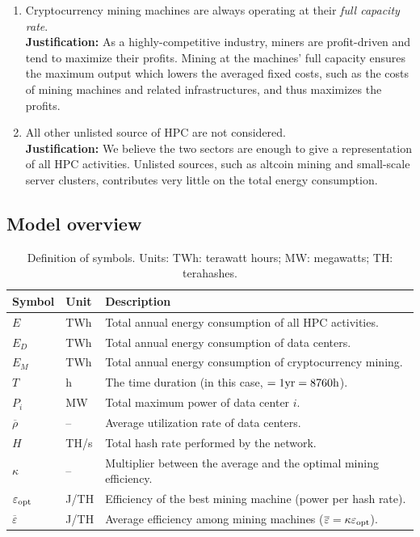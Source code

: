 \documentclass[12pt]{article}
\begin{document}
\begin{enumerate}
	\item Cryptocurrency mining machines are always operating at their \textit{full capacity rate}. \\
	\textbf{Justification:} As a highly-competitive industry, miners are profit-driven and tend to maximize their profits. Mining at the machines' full capacity ensures the maximum output which lowers the averaged fixed costs, such as the costs of mining machines and related infrastructures, and thus maximizes the profits.

	\item All other unlisted source of HPC are not considered. \\
	\textbf{Justification:} We believe the two sectors are enough to give a representation of all HPC activities. Unlisted sources, such as altcoin mining and small-scale server clusters, contributes very little on the total energy consumption.
\end{enumerate}

\subsection{Model overview}

\begin{table}[t]
	\centering
	\caption{Definition of symbols. Units: TWh: terawatt hours; MW: megawatts; TH: terahashes.}
	\label{table_symbols_q1}
	\begin{tabular}{lll}
		\hline
		\textbf{Symbol} & \textbf{Unit} & \textbf{Description} \\
		\hline
		$E$ & TWh & Total annual energy consumption of all HPC activities. \\
		$E_D$ & TWh & Total annual energy consumption of data centers. \\
		$E_M$ & TWh & Total annual energy consumption of cryptocurrency mining. \\
		$T$ & h & The time duration (in this case, $\rm = 1yr = 8760h$). \\
		$P_i$ & MW & Total maximum power of data center $i$. \\
		$\overline{\rho}$ & -- & Average utilization rate of data centers. \\
		$H$ & TH/s & Total hash rate performed by the network. \\
		$\kappa$ & -- & Multiplier between the average and the optimal mining efficiency. \\
		$\varepsilon_{\rm opt}$ & J/TH & Efficiency of the best mining machine (power per hash rate). \\
		$\overline{\varepsilon}$ & J/TH & Average efficiency among mining machines ($\overline{\varepsilon} = \kappa \varepsilon_{\rm opt}$). \\
		\hline
	\end{tabular}
\end{table}
\end{document}
